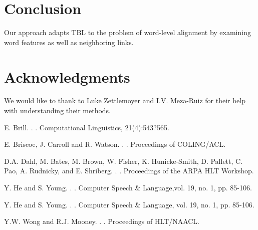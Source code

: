 \documentclass[11pt]{article}
\begin{document}
\section{Conclusion}

Our approach adapts TBL to the problem of
word-level alignment by examining word features
as well as neighboring links.
 
\section*{Acknowledgments}

We would like to thank to Luke Zettlemoyer and I.V. Meza-Ruiz for their help with understanding their methods.



\begin{thebibliography}{}

E. Brill.
.
.
\newblock Computational Linguistics, 21(4):543?565.

E. Briscoe, J. Carroll and R. Watson.
.
.
\newblock Proceedings of COLING/ACL.

D.A. Dahl, M. Bates, M. Brown, W. Fisher, K. Hunicke-Smith,
D. Pallett, C. Pao, A. Rudnicky, and E. Shriberg.
.
.
\newblock Proceedings of the ARPA HLT Workshop.

Y. He and S. Young.
.
.
\newblock Computer Speech \& Language,vol. 19, no. 1, pp. 85-106.

Y. He and S. Young.
.
.
\newblock Computer Speech \& Language, vol. 19, no. 1, pp. 85-106.

Y.W. Wong and R.J. Mooney.
.
.
\newblock Proceedings of HLT/NAACL.


\end{thebibliography}
\end{document}

